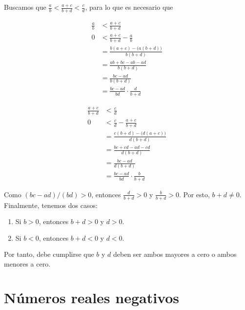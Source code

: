 \documentclass[11pt]{article}
\newcommand{\R}{\mathbb{R}}
\newcommand{\bfit}[1]{\textbf{\textit{#1}}}
\let\set\Set
\begin{document}
\begin{enumerate}[label=\alph*)]
 Buscamos que $\frac{a}{b}<\frac{a+c}{b+d}<\frac{c}{d}$, para lo que es necesario que
 \begin{center}%
 \begin{minipage}[l]{.5\linewidth}
 \begin{align*}
  \frac{a}{b} &< \frac{a+c}{b+d}\\
  0 &< \frac{a+c}{b+d} - \frac{a}{b}\\
  &= \frac{b(a+c)-\bigl(a(b+d)\bigr)}{b(b+d)}\\
  &= \frac{ab+bc-ab-ad}{b(b+d)}\\
  &= \frac{bc-ad}{b(b+d)}\\
  &= \frac{bc-ad}{bd} \cdot \frac{d}{b+d}
 \end{align*}
 \end{minipage}%
 \begin{minipage}[r]{.5\linewidth}
 \begin{align*}
  \frac{a+c}{b+d} &< \frac{c}{d}\\
  0 &< \frac{c}{d} -\frac{a+c}{b+d}\\
  &= \frac{c(b+d)-\bigl(d(a+c)\bigr)}{d(b+d)}\\
  &= \frac{bc+cd-ad-cd}{d(b+d)}\\
  &= \frac{bc-ad}{d(b+d)}\\
  &= \frac{bc-ad}{bd} \cdot \frac{b}{b+d}
 \end{align*}
 \end{minipage}
 \end{center}
 Como $(bc-ad)/(bd)>0$, entonces $\frac{d}{b+d}>0$ y $\frac{b}{b+d}>0$. Por esto, $b+d\neq 0$. Finalmente, tenemos dos casos: \begin{enumerate}[label=\roman*)]
  \item Si $b>0$, entonces $b+d>0$ y $d>0$.
  \item Si $b<0$, entonces $b+d<0$ y $d<0$.
 \end{enumerate}

 Por tanto, debe cumplirse que $b$ y $d$ deben ser ambos mayores a cero o ambos menores a cero.

\end{enumerate}



\section*{Números reales negativos}
\end{document}
